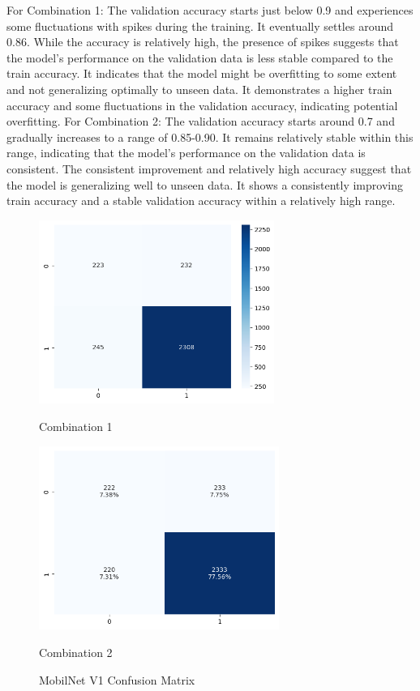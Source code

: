 For Combination 1: The validation accuracy starts just below 0.9 and experiences some fluctuations with spikes during the training. It eventually settles around 0.86. While the accuracy is relatively high, the presence of spikes suggests that the model's performance on the validation data is less stable compared to the train accuracy. It indicates that the model might be overfitting to some extent and not generalizing optimally to unseen data. It demonstrates a higher train accuracy and some fluctuations in the validation accuracy, indicating potential overfitting. \newline
For Combination 2: The validation accuracy starts around 0.7 and gradually increases to a range of 0.85-0.90. It remains relatively stable within this range, indicating that the model's performance on the validation data is consistent. The consistent improvement and relatively high accuracy suggest that the model is generalizing well to unseen data. It shows a consistently improving train accuracy and a stable validation accuracy within a relatively high range.

\begin{figure}[H]
    \centering
    \begin{minipage}[b]{0.49\textwidth}
        \centering
        \includegraphics[width=\textwidth, height=6cm]{Figures/unbalanced_data/without bn/mn1/cm.png}
        \captionsetup{labelformat=empty}
        \caption{Combination 1}
        \label{fig:u_wo_r_cm}
    \end{minipage}
    \hfill
    \begin{minipage}[b]{0.49\textwidth}
        \centering
        \includegraphics[width=\textwidth, height=6cm]{Figures/unbalanced_data/with bn/mn1/cm.png}
        \captionsetup{labelformat=empty}
        \caption{Combination 2}
        \label{fig:u_w_r_cm}
    \end{minipage}
    \captionsetup{labelformat=default}
    \caption{MobilNet V1 Confusion Matrix}
\end{figure}

